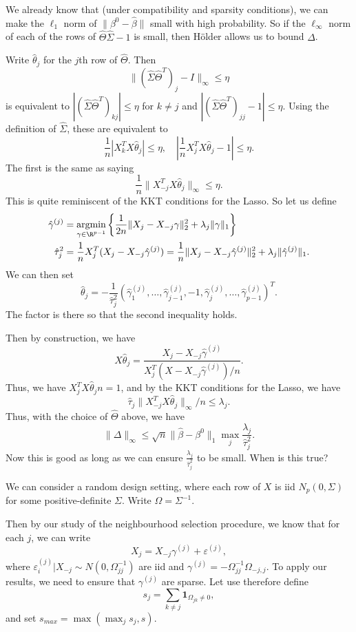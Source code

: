 \documentclass[a4paper]{article}
\DeclareMathOperator*\argmin{argmin}
\begin{document}
We already know that (under compatibility and sparsity conditions), we can make the $\ell_1$ norm of $\|\beta^0 - \hat{\beta}\|$ small with high probability. So if the $\ell_\infty$ norm of each of the rows of $\hat{\Theta} \hat{\Sigma} - 1$ is small, then H\"older allows us to bound $\Delta$.

Write $\hat{\theta}_j$ for the $j$th row of $\hat{\Theta}$. Then
\[
  \|(\hat{\Sigma} \hat{\Theta}^T)_j - I \|_\infty \leq \eta
\]
is equivalent to $|(\hat{\Sigma} \hat{\Theta}^T)_{kj}| \leq \eta$ for $k \not= j$ and $|(\hat{\Sigma} \hat{\Theta}^T)_{jj} - 1 | \leq \eta$. Using the definition of $\hat{\Sigma}$, these are equivalent to
\[
  \frac{1}{n}|X_k^T X \hat{\theta}_j| \leq \eta,\quad \left|\frac{1}{n} X^T_j X \hat{\theta}_j - 1 \right| \leq \eta.
\]
The first is the same as saying
\[
  \frac{1}{n} \|X_{-j}^T X \hat{\theta}_j\|_\infty \leq \eta.
\]
This is quite reminiscent of the KKT conditions for the Lasso. So let us define
\begin{align*}
  \hat{\gamma}^{(j)} &= \argmin_{\gamma \in \R^{p - 1}} \left\{\frac{1}{2n} \|X_j - X_{-j} \gamma\|_2^2 + \lambda_j \|\gamma\|_1\right\}\\
  \hat{\tau}_j^2 &= \frac{1}{n} X_j^T (X_j - X_{-j} \hat{\gamma}^{(j)}) = \frac{1}{n} \|X_j - X_{-j} \hat{\gamma}^{(j)}\|_2^2 + \lambda_j \|\hat{\gamma}^{(j)}\|_1.
\end{align*}
We can then set
\[
  \hat{\theta}_j = -\frac{1}{\hat{\tau}_j^2} (\hat{\gamma}_1^{(j)}, \ldots, \hat{\gamma}_{j - 1}^{(j)}, -1, \hat{\gamma}_j^{(j)}, \ldots, \hat{\gamma}_{p - 1}^{(j)})^T.
\]
The factor is there so that the second inequality holds.

Then by construction, we have
\[
  X \hat{\theta}_j = \frac{X_j - X_{-j} \hat{\gamma}^{(j)}}{X^T_j(X - X_{-j} \hat{\gamma}^{(j)})/n}.
\]
Thus, we have $X_j^T X \hat{\theta}_j n = 1$, and by the KKT conditions for the Lasso, we have
\[
  \hat{\tau}_j \|X_{-j}^T X \hat{\theta}_j\|_{\infty}/n \leq \lambda_j.
\]
Thus, with the choice of $\hat{\Theta}$ above, we have
\[
  \|\Delta\|_{\infty} \leq \sqrt{n} \|\hat{\beta} - \beta^0\|_1 \max_j \frac{\lambda_j}{\hat{\tau}_j^2}.
\]
Now this is good as long as we can ensure $\frac{\lambda_j}{\hat{\tau}_j^2}$ to be small. When is this true?

We can consider a random design setting, where each row of $X$ is iid $N_p(0, \Sigma)$ for some positive-definite $\Sigma$. Write $\Omega = \Sigma^{-1}$.

Then by our study of the neighbourhood selection procedure, we know that for each $j$, we can write
\[
  X_j = X_{-j} \gamma^{(j)} + \varepsilon^{(j)},
\]
where $\varepsilon_i^{(j)}| X_{-j} \sim N(0, \Omega_{jj}^{-1})$ are iid and $\gamma^{(j)} =  - \Omega_{jj}^{-1} \Omega_{-j, j}$. To apply our results, we need to ensure that $\gamma^{(j)}$ are sparse. Let use therefore define
\[
  s_j = \sum_{k \not= j} \mathbf{1}_{\Omega_{jk} \not =0},
\]
and set $s_{max} = \max (\max_j s_j, s)$.
\end{document}
